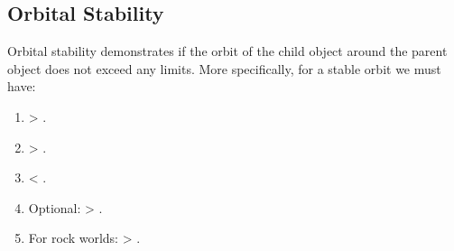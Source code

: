 \documentclass[letterpaper,10pt,english]{sphinxmanual}
\begin{document}
\subsection{Orbital Stability}
\label{\detokenize{quantities/orbital/orbital_stability:orbital-stability}}\label{\detokenize{quantities/orbital/orbital_stability::doc}}\label{\detokenize{quantities/orbital/orbital_stability:id1}}
\sphinxAtStartPar
Orbital stability demonstrates if the orbit of the child object around the parent object
does not exceed any limits. More specifically, for a stable orbit we must have:
\begin{enumerate}
%
\item {} 
\sphinxAtStartPar
{\hyperref[\detokenize{quantities/orbital/periapsis:id1}]{}} \textgreater{} {\hyperref[\detokenize{quantities/children_orbit_limits/roche_limit:id1}]{}}.

\item {} 
\sphinxAtStartPar
{\hyperref[\detokenize{quantities/orbital/semi_major_axis:id1}]{}} \textgreater{} {\hyperref[\detokenize{quantities/children_orbit_limits/p_type_critical_orbit:p-type-critical-orbit}]{}}.

\item {} 
\sphinxAtStartPar
{\hyperref[\detokenize{quantities/orbital/semi_major_axis:id1}]{}} \textless{} {\hyperref[\detokenize{quantities/orbital/semi_major_axis_maximum_limit:id1}]{}}.

\item {} 
\sphinxAtStartPar
Optional: {\hyperref[\detokenize{quantities/orbital/semi_major_axis:id1}]{}} \textgreater{} {\hyperref[\detokenize{quantities/children_orbit_limits/inner_orbit_limit:id1}]{}}.

\item {} 
\sphinxAtStartPar
For rock worlds: {\hyperref[\detokenize{quantities/orbital/semi_major_axis:id1}]{}} \textgreater{} {\hyperref[\detokenize{quantities/children_orbit_limits/outer_rock_formation_limit:id1}]{}}.

\end{enumerate}
\end{document}
